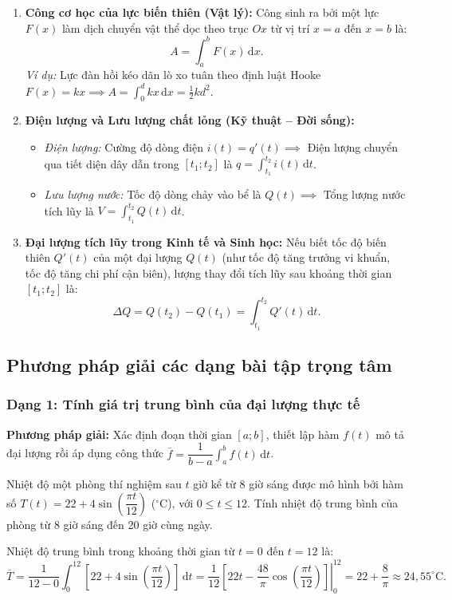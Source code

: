 \documentclass[12pt]{article}
\begin{document}
	\begin{enumerate}[label=\textbf{\arabic*.}]
		\item \textbf{Công cơ học của lực biến thiên (Vật lý):} Công sinh ra bởi một lực $F(x)$ làm dịch chuyển vật thể dọc theo trục $Ox$ từ vị trí $x = a$ đến $x = b$ là:
		\[
		A = \int_a^b F(x)\,\mathrm{d}x.
		\]
		\textit{Ví dụ:} Lực đàn hồi kéo dãn lò xo tuân theo định luật Hooke $F(x) = kx \implies A = \displaystyle \int_0^d kx\,\mathrm{d}x = \frac{1}{2}kd^2$.
		
		\item \textbf{Điện lượng và Lưu lượng chất lỏng (Kỹ thuật -- Đời sống):}
		\begin{itemize}[itemsep=2pt]
			\item \textit{Điện lượng:} Cường độ dòng điện $i(t) = q'(t) \implies$ Điện lượng chuyển qua tiết diện dây dẫn trong $[t_1; t_2]$ là $q = \displaystyle \int_{t_1}^{t_2} i(t)\,\mathrm{d}t$.
			\item \textit{Lưu lượng nước:} Tốc độ dòng chảy vào bể là $Q(t) \implies$ Tổng lượng nước tích lũy là $V = \displaystyle \int_{t_1}^{t_2} Q(t)\,\mathrm{d}t$.
		\end{itemize}
		
		\item \textbf{Đại lượng tích lũy trong Kinh tế và Sinh học:} 
		Nếu biết tốc độ biến thiên $Q'(t)$ của một đại lượng $Q(t)$ (như tốc độ tăng trưởng vi khuẩn, tốc độ tăng chi phí cận biên), lượng thay đổi tích lũy sau khoảng thời gian $[t_1; t_2]$ là:
		\[
		\Delta Q = Q(t_2) - Q(t_1) = \int_{t_1}^{t_2} Q'(t)\,\mathrm{d}t.
		\]
	\end{enumerate}
	
	\subsection{Phương pháp giải các dạng bài tập trọng tâm}
	
	\subsubsection{Dạng 1: Tính giá trị trung bình của đại lượng thực tế}
	\noindent \textbf{Phương pháp giải:} Xác định đoạn thời gian $[a; b]$, thiết lập hàm $f(t)$ mô tả đại lượng rồi áp dụng công thức $\bar{f} = \dfrac{1}{b - a} \displaystyle \int_a^b f(t)\,\mathrm{d}t$.
	
	\begin{vidu}[1]
		Nhiệt độ một phòng thí nghiệm sau $t$ giờ kể từ 8 giờ sáng được mô hình bởi hàm số $T(t) = 22 + 4\sin\left(\dfrac{\pi t}{12}\right)$ ($^\circ\text{C}$), với $0 \le t \le 12$. Tính nhiệt độ trung bình của phòng từ 8 giờ sáng đến 20 giờ cùng ngày.
	\end{vidu}
	\begin{loigiai}
		Nhiệt độ trung bình trong khoảng thời gian từ $t = 0$ đến $t = 12$ là:
		\[
		\bar{T} = \frac{1}{12 - 0} \int_0^{12} \left[22 + 4\sin\left(\frac{\pi t}{12}\right)\right]\,\mathrm{d}t 
		= \frac{1}{12} \left. \left[ 22t - \frac{48}{\pi}\cos\left(\frac{\pi t}{12}\right) \right] \right|_0^{12}
		= 22 + \frac{8}{\pi} \approx 24{,}55^\circ\text{C}.
		\]
	\end{loigiai}
	
\end{document}
